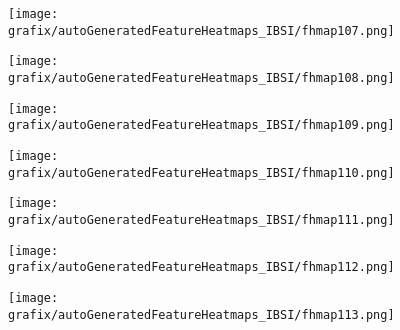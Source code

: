 \hspace{\hsp} 
\begin{subfigure}{\wid\textwidth} 
    \centering 
    \caption{\tiny \sffamily {}} 
    \vspace{\vsp} 
    \texttt{[image: grafix/autoGeneratedFeatureHeatmaps\_IBSI/fhmap107.png]} 
\end{subfigure} 
\hspace{\hsp} 
\begin{subfigure}{\wid\textwidth} 
    \centering 
    \caption{\tiny \sffamily {}} 
    \vspace{\vsp} 
    \texttt{[image: grafix/autoGeneratedFeatureHeatmaps\_IBSI/fhmap108.png]} 
\end{subfigure} 
\hspace{\hsp} 
\begin{subfigure}{\wid\textwidth} 
    \centering 
    \caption{\tiny \sffamily {}} 
    \vspace{\vsp} 
    \texttt{[image: grafix/autoGeneratedFeatureHeatmaps\_IBSI/fhmap109.png]} 
\end{subfigure} 
\hspace{\hsp} 
\begin{subfigure}{\wid\textwidth} 
    \centering 
    \caption{\tiny \sffamily {}} 
    \vspace{\vsp} 
    \texttt{[image: grafix/autoGeneratedFeatureHeatmaps\_IBSI/fhmap110.png]} 
\end{subfigure} 
\hspace{\hsp} 
\begin{subfigure}{\wid\textwidth} 
    \centering 
    \caption{\tiny \sffamily {}} 
    \vspace{\vsp} 
    \texttt{[image: grafix/autoGeneratedFeatureHeatmaps\_IBSI/fhmap111.png]} 
\end{subfigure} 
\hspace{\hsp} 
\begin{subfigure}{\wid\textwidth} 
    \centering 
    \caption{\tiny \sffamily {}} 
    \vspace{\vsp} 
    \texttt{[image: grafix/autoGeneratedFeatureHeatmaps\_IBSI/fhmap112.png]} 
\end{subfigure} 
\hspace{\hsp} 
\begin{subfigure}{\wid\textwidth} 
    \centering 
    \caption{\tiny \sffamily {}} 
    \vspace{\vsp} 
    \texttt{[image: grafix/autoGeneratedFeatureHeatmaps\_IBSI/fhmap113.png]} 
\end{subfigure} 
